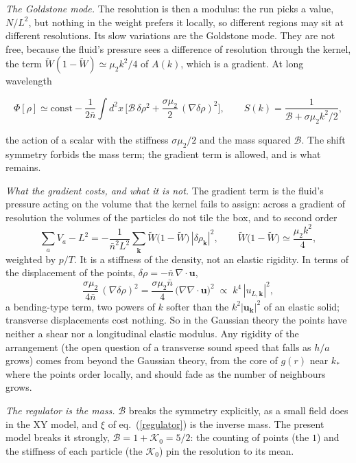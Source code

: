 \documentclass[11pt,aps,preprint,nofootinbib,superscriptaddress,tightenlines]{revtex4-2}
\def\st{\begin{equation}}
\def\stp{\end{equation}}
\def\Eq#1{eq.~(\ref{#1})}
\begin{document}
\emph{The Goldstone mode.}  The resolution is then a modulus: the run picks a value, $N/L^2$, but nothing in the weight prefers it locally, so different
regions may sit at different resolutions.  Its slow variations are the Goldstone mode.  They are not free, because the fluid's pressure sees a difference
of resolution through the kernel, the term $\widetilde W(1-\widetilde W)\simeq\mu_2k^2/4$ of $A(k)$, which is a gradient.  At long wavelength
\begin{keyeq}
\st
\Phi[\rho]\simeq\text{const}-\frac1{2\bar n}\int d^2x\,\Big[\mathcal B\,\delta\rho^2+\frac{\sigma\mu_2}2\,(\nabla\delta\rho)^2\Big],
\qquad S(k)=\frac{1}{\mathcal B+\sigma\mu_2k^2/2} ,
\label{goldstone}
\stp
\end{keyeq}
the action of a scalar with the stiffness $\sigma\mu_2/2$ and the mass squared $\mathcal B$.  The shift symmetry forbids the mass term; the gradient term
is allowed, and is what remains.

\emph{What the gradient costs, and what it is not.}  The gradient term is the fluid's pressure acting on the volume that the kernel fails to assign:
across a gradient of resolution the volumes of the particles do not tile the box, and to second order
\st
\sum_aV_a-L^2=-\frac1{\bar n^2L^2}\sum_{\bm k}\widetilde W\big(1-\widetilde W\big)\,|\delta\rho_{\bm k}|^2,\qquad \widetilde W\big(1-\widetilde W\big)\simeq\frac{\mu_2k^2}4 ,
\stp
weighted by $p/T$.  It is a stiffness of the density, not an elastic rigidity.  In terms of the displacement of the points, $\delta\rho=-\bar n\,\nabla\!\cdot\bm u$,
\st
\frac{\sigma\mu_2}{4\bar n}\,(\nabla\delta\rho)^2=\frac{\sigma\mu_2\bar n}4\,\big(\nabla\nabla\!\cdot\bm u\big)^2\;\propto\;k^4\,|u_{L,\bm k}|^2 ,
\stp
a bending-type term, two powers of $k$ softer than the $k^2|\bm u_{\bm k}|^2$ of an elastic solid; transverse displacements cost nothing.  So in the Gaussian
theory the points have neither a shear nor a longitudinal elastic modulus.  Any rigidity of the arrangement (the open question of a transverse sound speed that
falls as $h/a$ grows) comes from beyond the Gaussian theory, from the core of $g(r)$ near $k_*$ where the points order locally, and should fade as the number
of neighbours grows.

\emph{The regulator is the mass.}  $\mathcal B$ breaks the symmetry explicitly, as a small field does in the XY model, and $\xi$ of \Eq{regulator} is the
inverse mass.  The present model breaks it strongly, $\mathcal B=1+\mathcal K_0=5/2$: the counting of points (the $1$) and the stiffness of each particle
(the $\mathcal K_0$) pin the resolution to its mean.
\end{document}
